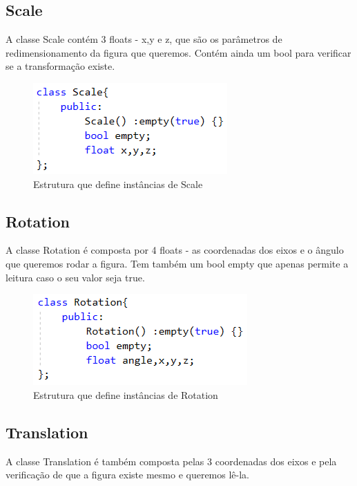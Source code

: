 \documentclass[a4paper]{article}
\begin{document}
\subsection{Scale}
\label{sec:scale}

A classe Scale contém 3 floats - x,y e z, que são os parâmetros de redimensionamento da figura que queremos. Contém ainda um bool para verificar se a transformação existe.

\begin{figure}[H]
\centering
\includegraphics[scale=0.8]{scale.png}
\caption{Estrutura que define instâncias de Scale}
\label{img:Scale}
\end{figure}


\subsection{Rotation}
\label{sec:rotation}

A classe Rotation é composta por 4 floats - as coordenadas dos eixos e o ângulo que queremos rodar a figura. Tem também um bool empty que apenas permite a leitura caso o seu valor seja true.

\begin{figure}[H]
\centering
\includegraphics[scale=0.8]{rotation.png}
\caption{Estrutura que define instâncias de Rotation}
\label{img:Rotation}
\end{figure}


\subsection{Translation}
\label{sec:translation}

A classe Translation é também composta pelas 3 coordenadas dos eixos e pela verificação de que a figura existe mesmo e queremos lê-la.
\end{document}
